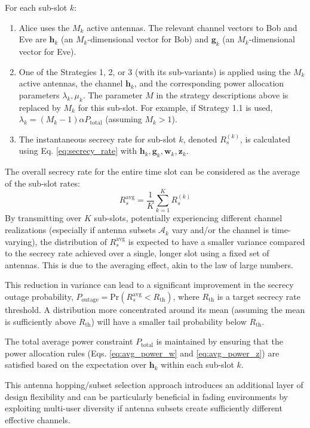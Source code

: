 \documentclass[10pt,a4paper]{article} %
\begin{document}
For each sub-slot $k$:
\begin{enumerate}
    \item Alice uses the $M_k$ active antennas. The relevant channel vectors to Bob and Eve are $\mathbf{h}_k$ (an $M_k$-dimensional vector for Bob) and $\mathbf{g}_k$ (an $M_k$-dimensional vector for Eve).
    \item One of the Strategies 1, 2, or 3 (with its sub-variants) is applied using the $M_k$ active antennas, the channel $\mathbf{h}_k$, and the corresponding power allocation parameters $\lambda_k, \mu_k$. The parameter $M$ in the strategy descriptions above is replaced by $M_k$ for this sub-slot. For example, if Strategy 1.1 is used, $\lambda_k = (M_k-1)\alpha P_{\text{total}}$ (assuming $M_k>1$).
    \item The instantaneous secrecy rate for sub-slot $k$, denoted $R_s^{(k)}$, is calculated using Eq. \eqref{eq:secrecy_rate} with $\mathbf{h}_k, \mathbf{g}_k, \mathbf{w}_k, \mathbf{z}_k$.
\end{enumerate}

The overall secrecy rate for the entire time slot can be considered as the average of the sub-slot rates:
\begin{equation}
    R_s^{\text{avg}} = \frac{1}{K} \sum_{k=1}^K R_s^{(k)}
\end{equation}
By transmitting over $K$ sub-slots, potentially experiencing different channel realizations (especially if antenna subsets $\mathcal{A}_k$ vary and/or the channel is time-varying), the distribution of $R_s^{\text{avg}}$ is expected to have a smaller variance compared to the secrecy rate achieved over a single, longer slot using a fixed set of antennas. This is due to the averaging effect, akin to the law of large numbers.

This reduction in variance can lead to a significant improvement in the secrecy outage probability, $P_{\text{outage}} = \text{Pr}(R_s^{\text{avg}} < R_{\text{th}})$, where $R_{\text{th}}$ is a target secrecy rate threshold. A distribution more concentrated around its mean (assuming the mean is sufficiently above $R_{\text{th}}$) will have a smaller tail probability below $R_{\text{th}}$.

The total average power constraint $P_{\text{total}}$ is maintained by ensuring that the power allocation rules (Eqs. \eqref{eq:avg_power_w} and \eqref{eq:avg_power_z}) are satisfied based on the expectation over $\mathbf{h}_k$ within each sub-slot $k$.

This antenna hopping/subset selection approach introduces an additional layer of design flexibility and can be particularly beneficial in fading environments by exploiting multi-user diversity if antenna subsets create sufficiently different effective channels.
\end{document}
